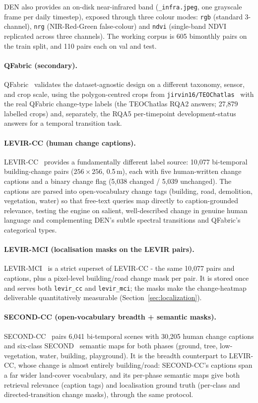 \documentclass{article}
\begin{document}
DEN also provides an on-disk near-infrared band (\texttt{\_infra.jpeg}, one
grayscale frame per daily timestep), exposed through three colour modes:
\texttt{rgb} (standard 3-channel), \texttt{nrg} (NIR-Red-Green false-colour) and
\texttt{ndvi} (single-band NDVI replicated across three channels). The working
corpus is 605 bimonthly pairs on the train split, and 110 pairs each on val and
test.

\paragraph{QFabric (secondary).}
QFabric~\cite{qfabric} validates the dataset-agnostic design on a different
taxonomy, sensor, and crop scale, using the polygon-centred crops from
\texttt{jirvin16/TEOChatlas}~\cite{teochat} with the real QFabric change-type
labels (the TEOChatlas RQA2 answers; 27{,}879 labelled crops) and, separately,
the RQA5 per-timepoint development-status answers for a temporal transition task.

\paragraph{LEVIR-CC (human change captions).}
LEVIR-CC~\cite{levircc} provides a fundamentally different label source: 10{,}077
bi-temporal building-change pairs ($256\times256$, 0.5\,m), each with five
human-written change captions and a binary change flag (5{,}038 changed /
5{,}039 unchanged). The captions are parsed into open-vocabulary change tags
(building, road, demolition, vegetation, water) so that free-text queries map
directly to caption-grounded relevance,
testing the engine on salient, well-described change in genuine human language
and complementing DEN's subtle spectral transitions and QFabric's categorical
types.

\paragraph{LEVIR-MCI (localisation masks on the LEVIR pairs).}
LEVIR-MCI~\cite{levirmci} is a strict superset of LEVIR-CC - the same 10{,}077
pairs and captions, plus a pixel-level building/road change mask per pair. It is
stored once and serves both \texttt{levir\_cc} and \texttt{levir\_mci};
the masks make the change-heatmap
deliverable quantitatively measurable (Section~\ref{sec:localization}).

\paragraph{SECOND-CC (open-vocabulary breadth + semantic masks).}
SECOND-CC~\cite{secondcc} pairs 6{,}041 bi-temporal scenes with 30{,}205 human
change captions and six-class SECOND~\cite{second} semantic maps for both
phases (ground, tree, low-vegetation, water, building, playground). It is the
breadth counterpart to LEVIR-CC, whose change is almost entirely building/road:
SECOND-CC's captions span a far wider land-cover vocabulary, and its per-phase
semantic maps give both retrieval relevance (caption tags) and localisation
ground truth (per-class and directed-transition change masks), through the same
protocol.
\end{document}
